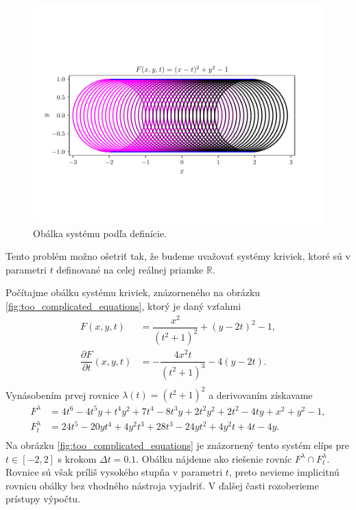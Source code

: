 \begin{figure}[H]
	\centering
	\includegraphics[trim={0 1.65cm 0 2cm},clip]{images/system_with_correct_envelope.pdf}
	\caption{Obálka systému podľa definície.}
	\label{fig:system_with_correct_envelope}
\end{figure}

Tento problém možno ošetriť tak, že budeme uvažovať systémy kriviek, ktoré sú v parametri $t$ definované na celej reálnej priamke $\mathbb{R}$. 

\begin{example}
\label{example:too_complicated_equations}
Počítajme obálku systému kriviek, znázorneného na obrázku \ref{fig:too_complicated_equations}, ktorý je daný vzťahmi
\begin{align*}
F(x,y, t) &= \dfrac{x^2}{(t^2 + 1)^2} + (y - 2t)^2 - 1, \\
\dfrac{\partial F}{\partial t}(x, y, t) &= -\dfrac{4x^2t}{\left(t^2+1\right)^3}-4\left(y-2t\right). \\
\end{align*}
Vynásobením prvej rovnice $ \lambda(t) = (t^2 + 1)^2$ a derivovaním získavame
\begin{align*}
F^\lambda &= 4 t^6 - 4 t^5 y + t^4 y^2 + 7 t^4 - 8 t^3 y + 2 t^2 y^2 + 2 t^2 - 4 t y + x^2 + y^2 - 1, \\
F_t^\lambda &= 24t^5-20yt^4+4y^2t^3+28t^3-24yt^2+4y^2t+4t-4y. \\
\end{align*}
Na obrázku \ref{fig:too_complicated_equations} je znázornený tento systém elíps pre $t \in [-2,2]$ s krokom $\Delta t=0.1$. Obálku nájdeme ako riešenie rovníc $F^\lambda \cap F_t^\lambda. $ Rovnice sú však príliš vysokého stupňa v parametri $t$, preto nevieme implicitnú rovnicu obálky bez vhodného nástroja vyjadriť. V ďalšej časti rozoberieme prístupy výpočtu.
\end{example}

